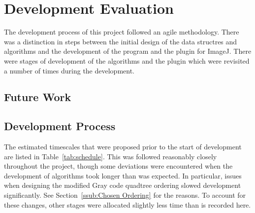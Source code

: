 
\section{Development Evaluation}
\label{sec:development_evaluation}

The development process of this project followed an agile methodology. There
was a distinction in steps between the initial design of the data structres and
algorithms and the development of the program and the plugin for ImageJ. There
were stages of development of the algorithms and the plugin which were
revisited a number of times during the development.

\subsection{Future Work}
\label{sub:future_work}


\subsection{Development Process}
\label{sub:development_process}

The estimated timescales that were proposed prior to the start of development
are listed in Table~\ref{tab:schedule}. This was followed reasonably closely
throughout the project, though some deviations were encountered when the
development of algorithms took longer than was expected. In particular, issues
when designing the modified Gray code quadtree ordering slowed development
significantly. See Section~\ref{ssub:Chosen Ordering} for the reasons. To
account for these changes, other stages were allocated slightly less time than
is recorded here.

